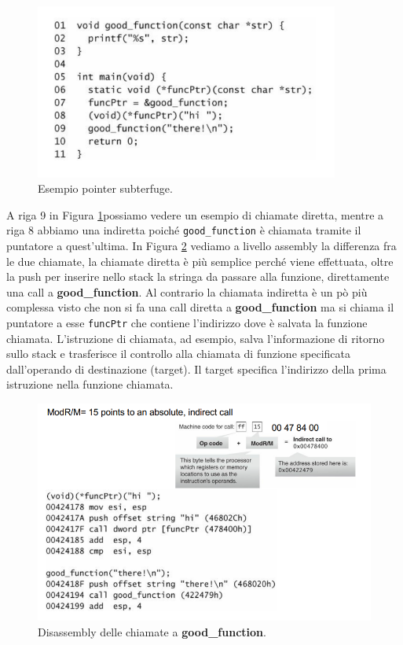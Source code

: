 \begin{figure}[H]
	\centering
	\includegraphics[width=10cm, keepaspectratio]{capitoli/secure_coding/img/cap_5/ult_es_point_sub.png}
	\caption{Esempio pointer subterfuge.}\label{fig:ult_es_poin}
\end{figure}

A riga 9 in Figura \ref{fig:ult_es_poin}possiamo vedere un esempio di chiamate diretta,
mentre a riga 8 abbiamo una indiretta poiché \verb|good_function| è chiamata tramite
il puntatore a quest'ultima. In Figura \ref{fig:dissas_ult_es_poin} vediamo a livello
assembly la differenza fra le due chiamate, la chiamate diretta è più semplice perché
viene effettuata, oltre la push per inserire nello stack la stringa da passare alla
funzione, direttamente una call a \textbf{good\_function}. Al contrario la chiamata
indiretta è un pò più complessa visto che non si fa una call
diretta a \textbf{good\_function} ma si chiama il puntatore a esse \verb|funcPtr|
che contiene l'indirizzo dove è salvata la funzione chiamata. L'istruzione di chiamata,
ad esempio, salva l'informazione di ritorno sullo stack e trasferisce il controllo
alla chiamata di funzione specificata dall'operando di destinazione (target). Il target
specifica l'indirizzo della prima istruzione nella funzione chiamata.

\begin{figure}[H]
	\centering
	\includegraphics[width=12cm, keepaspectratio]{capitoli/secure_coding/img/cap_5/dissas_ult_es_point.png}
	\caption{Disassembly delle chiamate a \textbf{good\_function}.}\label{fig:dissas_ult_es_poin}
\end{figure}

